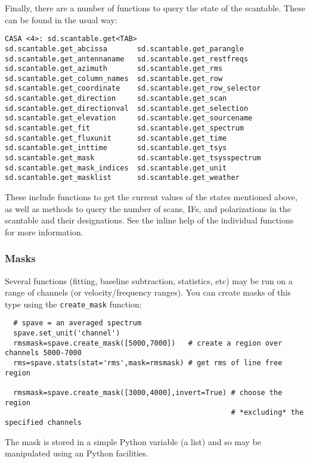 Finally, there are a number of functions to query the state of the
scantable.  These can be found in the usual way:
\small
\begin{verbatim}
CASA <4>: sd.scantable.get<TAB>
sd.scantable.get_abcissa       sd.scantable.get_parangle
sd.scantable.get_antennaname   sd.scantable.get_restfreqs
sd.scantable.get_azimuth       sd.scantable.get_rms
sd.scantable.get_column_names  sd.scantable.get_row
sd.scantable.get_coordinate    sd.scantable.get_row_selector
sd.scantable.get_direction     sd.scantable.get_scan
sd.scantable.get_directionval  sd.scantable.get_selection
sd.scantable.get_elevation     sd.scantable.get_sourcename
sd.scantable.get_fit           sd.scantable.get_spectrum
sd.scantable.get_fluxunit      sd.scantable.get_time
sd.scantable.get_inttime       sd.scantable.get_tsys
sd.scantable.get_mask          sd.scantable.get_tsysspectrum
sd.scantable.get_mask_indices  sd.scantable.get_unit
sd.scantable.get_masklist      sd.scantable.get_weather
\end{verbatim}
\normalsize
These include functions to get the current values of the states
mentioned above, as well as
methods to query the number of scans, IFs, and polarizations
in the scantable and their designations.  See the
inline help of the individual functions for more information.

\subsubsection{Masks}
\label{subsubsection:sd.asap.scantable.masks}

Several functions (fitting, baseline subtraction, statistics, etc) may
be run on a range of channels (or velocity/frequency ranges). You can
create masks of this type using the {\tt create\_mask} function:

\small
\begin{verbatim}
  # spave = an averaged spectrum
  spave.set_unit('channel')
  rmsmask=spave.create_mask([5000,7000])   # create a region over channels 5000-7000
  rms=spave.stats(stat='rms',mask=rmsmask) # get rms of line free region

  rmsmask=spave.create_mask([3000,4000],invert=True) # choose the region 
                                                     # *excluding* the specified channels
\end{verbatim}
\normalsize

The mask is stored in a simple Python variable (a list) and so may be
manipulated using an Python facilities. 

